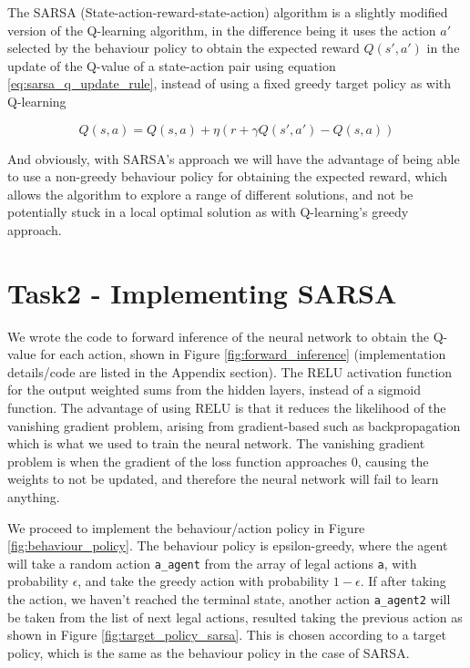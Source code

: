 \documentclass[conference]{IEEEtran}
\begin{document}
The SARSA (State-action-reward-state-action) algorithm is a slightly modified version of the Q-learning algorithm, in the difference being it uses the action $a'$ selected by the behaviour policy to obtain the expected reward $Q(s',a')$ in the update of the Q-value of a state-action pair using equation \ref{eq:sarsa_q_update_rule}, instead of using a fixed greedy target policy as with Q-learning

\begin{equation}
    Q(s,a) = Q(s,a) + \eta(r + \gamma Q(s',a') - Q(s,a))
    \label{eq:sarsa_q_update_rule}
\end{equation}

And obviously, with SARSA's approach we will have the advantage of being able to use a non-greedy behaviour policy for obtaining the expected reward, which allows the algorithm to explore a range of different solutions, and not be potentially stuck in a local optimal solution as with Q-learning's greedy approach. 

\section{Task2 - Implementing SARSA}
We wrote the code to forward inference of the neural network to obtain the Q-value for each action, shown in Figure \ref{fig:forward_inference} (implementation details/code are listed in the Appendix section). The RELU activation function for the output weighted sums from the hidden layers, instead of a sigmoid function. The advantage of using RELU is that it reduces the likelihood of the vanishing gradient problem\cite{relu advantage}, arising from gradient-based such as backpropagation which is what we used to train the neural network\cite{vanishing gradient problem}. The vanishing gradient problem is when the gradient of the loss function approaches 0, causing the weights to not be updated, and therefore the neural network will fail to learn anything.

We proceed to implement the behaviour/action policy in Figure \ref{fig:behaviour_policy}. The behaviour policy is epsilon-greedy, where the agent will take a random action \texttt{a\_agent} from the array of legal actions \texttt{a}, with probability $\epsilon$, and take the greedy action with probability $1 - \epsilon$. If after taking the action, we haven't reached the terminal state, another action \texttt{a\_agent2} will be taken from the list of next legal actions, resulted taking the previous action as shown in Figure \ref{fig:target_policy_sarsa}. This is chosen according to a target policy, which is the same as the behaviour policy in the case of SARSA.
\end{document}
